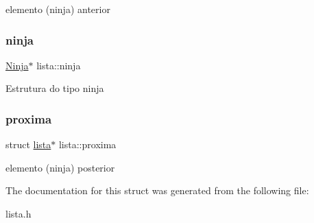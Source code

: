 elemento (ninja) anterior \mbox{\label{structlista_afabad83af39f6c62e272a359b377ad74}} 
\subsubsection{\texorpdfstring{ninja}{ninja}}
{\footnotesize\ttfamily \mbox{\hyperlink{structninja}{Ninja}}$\ast$ lista\+::ninja}

Estrutura do tipo ninja \mbox{\label{structlista_a75a04eea3bf4bbc679c49464ae83cabb}} 
\subsubsection{\texorpdfstring{proxima}{proxima}}
{\footnotesize\ttfamily struct \mbox{\hyperlink{structlista}{lista}}$\ast$ lista\+::proxima}

elemento (ninja) posterior 

The documentation for this struct was generated from the following file\+:\begin{DoxyCompactItemize}
\item 
lista.\+h\end{DoxyCompactItemize}
